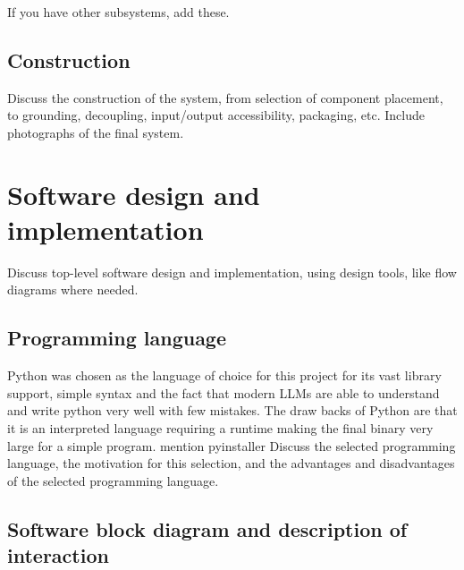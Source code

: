 \documentclass[11pt,a4paper]{article}
\begin{document}
If you have other subsystems, add these.

\subsection{Construction}

Discuss the construction of the system, from selection of component placement, to grounding, decoupling, input/output accessibility, packaging, etc. Include photographs of the final system.



\newpage
\section{Software design and implementation}

Discuss top-level software design and implementation, using design tools, like flow diagrams where needed. 

\subsection{Programming language}

Python was chosen as the language of choice for this  project for its vast library support, simple syntax and the fact that modern LLMs are able to understand and write python very well with few mistakes.  The draw backs of Python are that it is an interpreted language requiring a runtime making the final binary very large for a simple program. 
\newline \newline
mention pyinstaller
 \newline \newline
Discuss the selected programming language, the motivation for this selection, and the advantages and disadvantages of the selected programming language. 

\subsection{Software block diagram and description of interaction}
\end{document}

